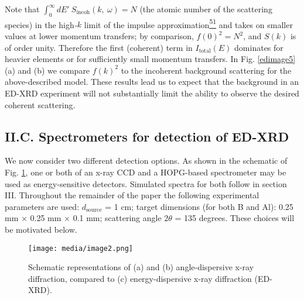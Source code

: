 Note that
\(\int_{0}^{\infty}{dE'}\ S_{\text{incoh}}\left( k,\ \omega \right) = N\)
(the atomic number of the scattering species) in the high\emph{-}\(k\)
limit of the impulse
approximation\hyperref[p.-eisenberger-and-p.-m.-platzman-physical-review-a-2-415-1970.]{\textsuperscript{51}}
and takes on smaller values at lower momentum transfers; by comparison,
\({f(0)}^{2} = N^{2}\), and \(S(k)\) is of order unity. Therefore the
first (coherent) term in \(I_{\text{total}}\left( E \right)\) dominates
for heavier elements or for sufficiently small momentum transfers. In
Fig. \ref{edimage5} (a) and (b) we compare \({f(k)}^{2}\) to the incoherent
background scattering for the above-described model. These results lead
us to expect that the background in an ED-XRD experiment will not
substantially limit the ability to observe the desired coherent
scattering.

\subsection{II.C. Spectrometers for detection of ED-XRD}

We now consider two different detection options. As shown in the
schematic of Fig. \ref{edimage2}, one or both of an x-ray CCD and a HOPG-based
spectrometer may be used as energy-sensitive detectors. Simulated
spectra for both follow in section III. Throughout the remainder of the
paper the following experimental parameters are used:
\(d_{\text{source}}\) = 1 cm; target dimensions (for both B and Al):
0.25 mm × 0.25 mm × 0.1 mm; scattering angle \(2\theta\) = 135 degrees.
These choices will be motivated below.

\begin{figure}[h] \label{edimage2}
\caption{ Schematic representations of (a) and (b) angle-dispersive
x-ray diffraction, compared to (c) energy-dispersive x-ray diffraction
(ED-XRD).}
\centering
\texttt{[image: media/image2.png]}
\end{figure}

